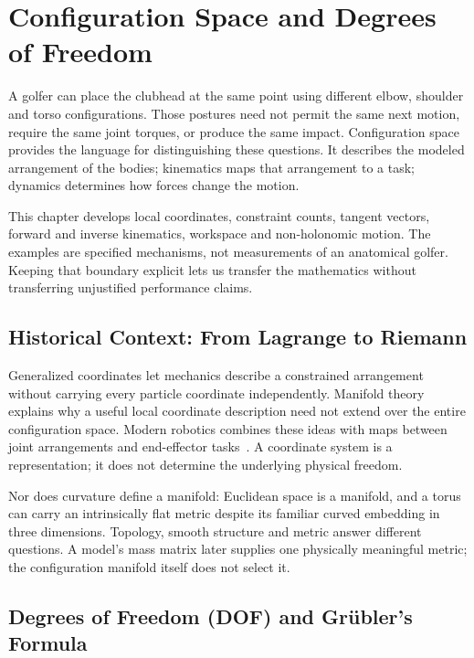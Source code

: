 \chapter{Configuration Space and Degrees of Freedom}
\label{ch:configuration}
\label{laymans:context_box}

A golfer can place the clubhead at the same point using different elbow, shoulder and torso configurations. Those postures need not permit the same next motion, require the same joint torques, or produce the same impact. Configuration space provides the language for distinguishing these questions. It describes the modeled arrangement of the bodies; kinematics maps that arrangement to a task; dynamics determines how forces change the motion.

This chapter develops local coordinates, constraint counts, tangent vectors, forward and inverse kinematics, workspace and non-holonomic motion. The examples are specified mechanisms, not measurements of an anatomical golfer. Keeping that boundary explicit lets us transfer the mathematics without transferring unjustified performance claims.

\section{Historical Context: From Lagrange to Riemann}
\label{sec:history}

Generalized coordinates let mechanics describe a constrained arrangement without carrying every particle coordinate independently. Manifold theory explains why a useful local coordinate description need not extend over the entire configuration space. Modern robotics combines these ideas with maps between joint arrangements and end-effector tasks~\cite{Murray1994,Lynch2017}. A coordinate system is a representation; it does not determine the underlying physical freedom.

Nor does curvature define a manifold: Euclidean space is a manifold, and a torus can carry an intrinsically flat metric despite its familiar curved embedding in three dimensions. Topology, smooth structure and metric answer different questions. A model's mass matrix later supplies one physically meaningful metric; the configuration manifold itself does not select it.

\section{Degrees of Freedom (DOF) and Grübler's Formula}
\label{sec:dof}
\label{def:dof}


